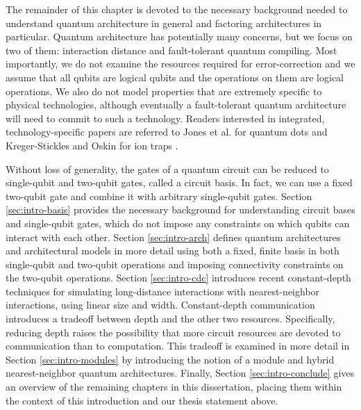 
The remainder of this chapter is devoted to the necessary background needed
to understand quantum architecture in general and factoring architectures
in particular. Quantum architecture has potentially many concerns, but we
focus on two of them: interaction distance and fault-tolerant quantum compiling.
Most importantly, we do not examine the resources required for error-correction
and we assume that all qubits are logical qubits and the operations on them
are logical operations. We also do not model properties that are extremely
specific to physical technologies, although eventually a
fault-tolerant quantum architecture will need to commit to such a technology.
Readers interested in integrated, technology-specific papers are referred
to Jones et al. for quantum dots \cite{Jones2010}
and Kreger-Stickles and Oskin for ion traps \cite{Kreger-Stickles2008}.

Without loss of generality, the gates of a quantum circuit can be reduced to
single-qubit and two-qubit gates, called a circuit basis.
In fact, we can use a fixed two-qubit gate
and combine it with arbitrary single-qubit gates.
Section \ref{sec:intro-basis} provides the necessary background for
understanding circuit bases and single-qubit gates,
which do not impose any constraints on
which qubits can interact with each other. Section \ref{sec:intro-arch}
defines quantum architectures and architectural models in more detail using
both a fixed, finite basis in both single-qubit and two-qubit operations
and imposing connectivity constraints on the two-qubit operations.
Section \ref{sec:intro-cdc} introduces recent constant-depth techniques
for simulating long-distance interactions with nearest-neighbor
interactions, using linear size and width. Constant-depth communication
introduces a tradeoff between depth and the other two resources. Specifically,
reducing depth raises the possibility that more circuit resources are
devoted to communication than to computation. This tradeoff is examined 
in more detail in Section \ref{sec:intro-modules}
by introducing the notion of a module and hybrid nearest-neighbor
quantum architectures.
Finally, Section \ref{sec:intro-conclude}
gives an overview of the remaining chapters in this dissertation,
placing them within the context of this introduction and our thesis statement
above.









